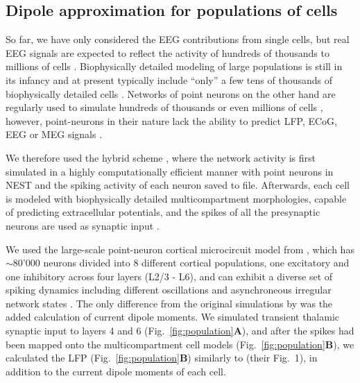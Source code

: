\documentclass[preprint,10pt,authoryear]{elsarticle}
\newcommand{\hlg}[2][Emerald]{ {\sethlcolor{#1} \hl{#2}} }
\newcommand{\tvnnote}[1]{\color{white}{\hlg{TVN: #1 }}\color{black}}
\begin{document}
\subsection{Dipole approximation for populations of cells}\label{subsec:populations}
So far, we have only considered the EEG contributions from single cells, but real EEG signals are expected to reflect the activity of hundreds of thousands to millions of cells \citep{NUNEZ2006, COHEN2017}. 
Biophysically detailed modeling of large populations is still in its infancy \citep{EINEVOLL2019} and at present typically include ``only'' a few tens of thousands of biophysically detailed cells \citep{MARKRAM2015, BILLEH2019}. Networks of point neurons on the other hand are regularly used to simulate hundreds of thousands \citep{BILLEH2019} or even millions of cells \citep{SENK2018, SCHMIDT2018}, however, point-neurons in their nature lack the ability to predict LFP, ECoG, EEG or MEG signals \citep{EINEVOLL2013REVIEW}.  

We therefore used the hybrid scheme \citep{HAGEN2016, SENK2018, Skaar2020biorxiv}\tvnnote{Add pablo when published}, where the network activity is first simulated in a highly computationally efficient manner with point neurons in NEST \citep{NEST} and the spiking activity of each neuron saved to file. Afterwards, each cell is modeled with biophysically detailed multicompartment morphologies, capable of predicting extracellular potentials, and the spikes of all the presynaptic neurons are used as synaptic input \citep{HAGEN2016, SENK2018}.

We used the large-scale point-neuron cortical microcircuit model from \cite{POTJANS2014, HAGEN2016}, which has $\sim$80'000 neurons divided into 8 different cortical populations, one excitatory and one inhibitory across four layers (L2/3 - L6), and can exhibit a diverse set of spiking dynamics including different oscillations and asynchroneous irregular network states \citep{HAGEN2016, BRUNEL2000}. 
The only difference from the original simulations by \cite{HAGEN2016} was the added calculation of current dipole moments.
We simulated transient thalamic synaptic input to layers 4 and 6 (Fig.~\ref{fig:population}\textbf{A}), and after the spikes had been mapped onto the multicompartment cell models (Fig.~\ref{fig:population}\textbf{B}), we calculated the LFP (Fig.~\ref{fig:population}\textbf{B}) similarly to \cite{HAGEN2016} (their Fig.~1), in addition to the current dipole moments of each cell.
\end{document}
